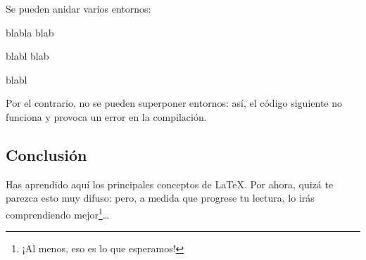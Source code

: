Se pueden anidar varios entornos:

\begin{latexcode}
\begin{1}
blabla blab
\begin{2}
blabl blab
\end{2}
blabl
\end{1}
\end{latexcode}

Por el contrario, no se pueden superponer entornos: así, el código siguiente no funciona y provoca un error en la compilación.



\subsection{Conclusión}

Has aprendido aquí los principales conceptos de \LaTeX. 
 Por ahora, quizá te parezca esto muy difuso: pero, a medida que progrese tu lectura, lo irás comprendiendo mejor\footnote{¡Al menos, eso es lo que esperamos!}\ldots


